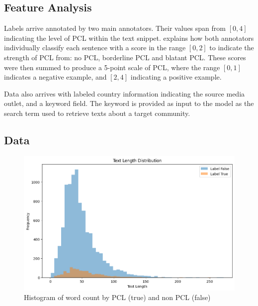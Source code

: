 \documentclass[11pt,a4paper]{article}
\begin{document}


\subsection{Feature Analysis}

Labels arrive annotated by two main annotators. Their values span from $[0,4]$ indicating the level of PCL within the text snippet. \citet{perez-almendros-etal-2020-dont} explains how both annotators individually classify each sentence with a score in the range $[0,2]$ to indicate the strength of PCL from: no PCL, borderline PCL and blatant PCL. These scores were then summed to produce a 5-point scale of PCL, where the range $[0,1]$ indicates a negative example, and $[2,4]$ indicating a positive example.

Data also arrives with labeled country information indicating the source media outlet, and a keyword field. The keyword is provided as input to the model as the search term used to retrieve texts about a target community.

\subsection{Data}


\begin{figure}[!h]
    \centering
    \includegraphics[trim=0cm 0cm 0cm .8cm, clip, width=\linewidth]{figures/text-input-length-by-binary-patronizing.png}
    \caption{Histogram of word count by PCL (true) and non PCL (false)\footnotemark}
    \label{fig:word-count}
\end{figure}
\end{document}
